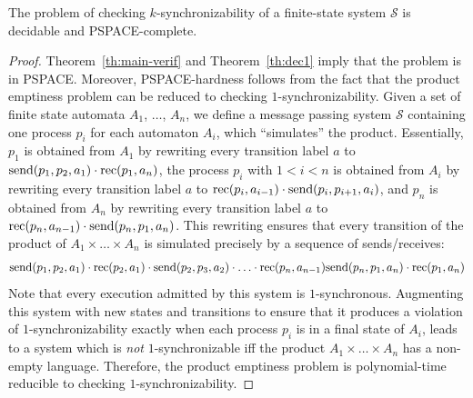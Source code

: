 \begin{theorem}
The problem of checking $k$-synchronizability of a finite-state system $\mathcal{S}$ is decidable and PSPACE-complete.
\end{theorem}
\begin{proof}
Theorem~\ref{th:main-verif} and Theorem~\ref{th:dec1} imply that the problem is in PSPACE. Moreover, PSPACE-hardness follows from the fact that the product emptiness problem can be reduced to checking $1$-synchronizability. Given a set of finite state automata $A_1$, $\ldots$, $A_n$, we define a message passing system $\mathcal{S}$ containing one process $p_i$ for each automaton $A_i$, which ``simulates'' the product. Essentially, $p_1$ is obtained from $A_1$ by rewriting every transition label $a$ to $\mathrm{send}({p_1,p_2,a_1})\cdot \mathrm{rec}({p_1,a_n})$, the process $p_i$ with $1<i<n$ is obtained from $A_i$ by rewriting every transition label $a$ to $\mathrm{rec}({p_i,a_{i-1}})\cdot \mathrm{send}({p_i,p_{i+1},a_i})$, and $p_n$ is obtained from $A_n$ by rewriting every transition label $a$ to $\mathrm{rec}({p_n,a_{n-1}})\cdot \mathrm{send}({p_n,p_1,a_n})$. This rewriting ensures that every transition of the product of $A_1\times\ldots\times A_n$ is simulated precisely by a sequence of sends/receives:
\begin{align*}
\mathrm{send}({p_1,p_2,a_1})\cdot \mathrm{rec}({p_2,a_1})\cdot \mathrm{send}({p_2,p_3,a_2})\cdot\ldots \cdot \mathrm{rec}({p_n,a_{n-1}}) \mathrm{send}({p_n,p_1,a_n})\cdot \mathrm{rec}({p_1,a_n})
\end{align*}
Note that every execution admitted by this system is $1$-synchronous. Augmenting this system with new states and transitions to ensure that it produces a violation of $1$-synchronizability exactly when each process $p_i$ is in a final state of $A_i$, leads to a system which is \emph{not} $1$-synchronizable iff the product $A_1\times\ldots\times A_n$ has a non-empty language. Therefore, the product emptiness problem is polynomial-time reducible to checking $1$-synchronizability.
\end{proof}

